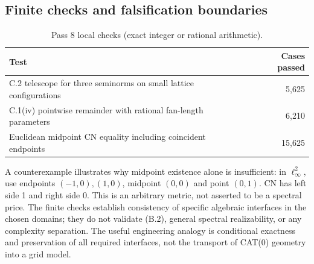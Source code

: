 \documentclass[11pt,letterpaper]{article}
\begin{document}
\subsection{Finite checks and falsification boundaries}
\begin{table}[htbp]
\small\centering
\caption{Pass 8 local checks (exact integer or rational arithmetic).}
\begin{tabularx}{\linewidth}{Yr}
\toprule
Test & Cases passed\\
\midrule
C.2 telescope for three seminorms on small lattice configurations & 5,625\\
C.1(iv) pointwise remainder with rational fan-length parameters & 6,210\\
Euclidean midpoint CN equality including coincident endpoints & 15,625\\
\bottomrule
\end{tabularx}
\end{table}
A counterexample illustrates why midpoint existence alone is insufficient: in $\ell_\infty^2$, use endpoints $(-1,0),(1,0)$, midpoint $(0,0)$ and point $(0,1)$. CN has left side 1 and right side 0. This is an arbitrary metric, not asserted to be a spectral price. The finite checks establish consistency of specific algebraic interfaces in the chosen domains; they do not validate (B.2), general spectral realizability, or any complexity separation. The useful engineering analogy is conditional exactness and preservation of all required interfaces, not the transport of CAT(0) geometry into a grid model.
\end{document}
